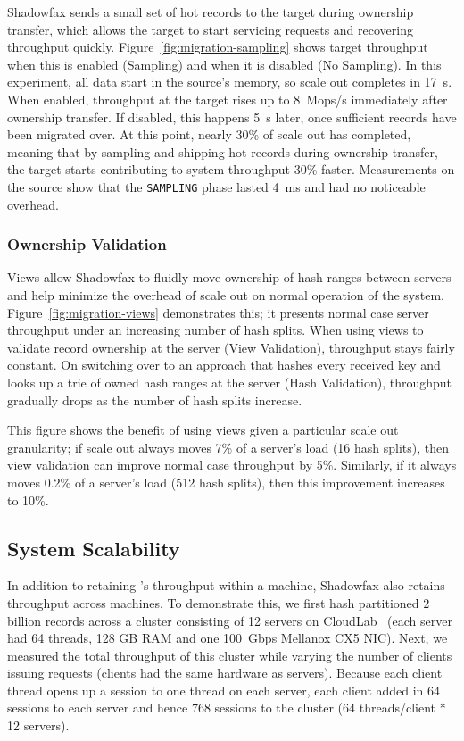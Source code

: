 Shadowfax sends a small set of hot records to the target during ownership
transfer, which allows the target to start servicing requests and recovering
throughput quickly.
%
Figure~\ref{fig:migration-sampling} shows target throughput
when this is enabled (Sampling) and when it is disabled (No
Sampling).
%
In this experiment, all data start in the source's memory, so scale out
completes in 17~s.
%
When enabled, throughput at the target rises up to 8~Mops/s immediately
after ownership transfer.
%
If disabled, this happens 5~s later, once sufficient records have
been migrated over.
%
At this point, nearly 30\% of scale out has completed, meaning that
by sampling and shipping hot records during ownership transfer,
the target starts contributing to system throughput 30\% faster.
%
Measurements on the source show that the \texttt{SAMPLING} phase lasted
4~ms and had no noticeable overhead.

\subsubsection{Ownership Validation}
\label{sec:eval:migration:views}

Views allow Shadowfax to fluidly move ownership of hash ranges between
servers and help minimize the overhead of scale out on normal
operation of the system.
%
Figure~\ref{fig:migration-views} demonstrates this; it presents normal
case server throughput under an increasing number of hash splits.
%
When using views to validate record ownership at the
server (View Validation), throughput stays fairly constant.
%
On switching over to an approach that hashes every received key and
looks up a trie of owned hash ranges at the server (Hash Validation),
throughput gradually drops as the number of hash splits increase.

This figure shows the benefit of using views given a particular scale
out granularity; if scale out always moves 7\% of a server's load (16
hash splits), then view validation can improve normal case
throughput by 5\%.
%
Similarly, if it always moves 0.2\% of a server's load (512 hash
splits), then this improvement increases to 10\%.

\subsection{System Scalability}
\label{sec:eval:system-scalability}

%
In addition to retaining \faster's throughput within a machine,
Shadowfax also retains throughput across machines.
%
To demonstrate this, we first hash partitioned 2 billion records across a
cluster consisting of 12 servers on
CloudLab~\cite{cloudlab} (each server had 64 threads, 128 GB RAM and
one 100~Gbps Mellanox CX5 NIC).
%
Next, we measured the total throughput of this cluster while varying the
number
of clients issuing requests (clients had the same hardware as servers).
%
Because each client thread opens up a session to one thread on each server,
each client added in 64 sessions to each server and hence 768 sessions
to the cluster (64 threads/client * 12 servers).

